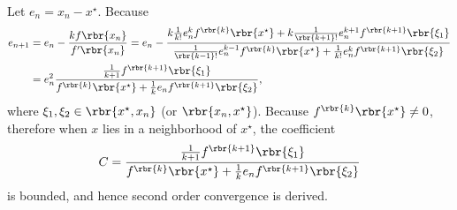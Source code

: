 \documentclass[english, nochinese]{../textmpls/pkupaper}
\title{\titlemark}
\author{\authoring}
\begin{document}
\maketitle

\begin{thmquestion}
\ 
\begin{thmproof}
Let $ e_n = x_n - x^{\star} $. Because
\begin{equation}
\begin{split}
e_{ n + 1 } &= e_n - \frac{ k f \rbr{x_n} }{ f' \rbr{x_n} } = e_n - \frac{ k \frac{1}{ k ! } e_n^k f^{\rbr{k}} \rbr{x^{\star}} + k \frac{1}{ \rbr{ k + 1 } ! } e_n^{ k + 1 } f^{\rbr{ k + 1 }} \rbr{\xi_1} }{ \frac{1}{ \rbr{ k - 1 } ! } e_n^{ k - 1 } f^{\rbr{k}} \rbr{x^{\star}} + \frac{1}{ k ! } e_n^k f^{\rbr{ k + 1 }} \rbr{\xi_2} } \\
&= e_n^2 \frac{ \frac{1}{ k + 1 } f^{\rbr{ k + 1 }} \rbr{\xi_1} }{ f^{\rbr{k}} \rbr{x^{\star}} + \frac{1}{k} e_n f^{\rbr{ k + 1 }} \rbr{\xi_2} },
\end{split}
\end{equation}
where $ \xi_1, \xi_2 \in \rbr{ x^{\star}, x_n } $ (or $ \rbr{ x_n, x^{\star} }$). Because $ f^{\rbr{k}} \rbr{x^{\star}} \neq 0 $, therefore when $x$ lies in a neighborhood of $x^{\star}$, the coefficient
\begin{equation}
C = \frac{ \frac{1}{ k + 1 } f^{\rbr{ k + 1 }} \rbr{\xi_1} }{ f^{\rbr{k}} \rbr{x^{\star}} + \frac{1}{k} e_n f^{\rbr{ k + 1 }} \rbr{\xi_2} }
\end{equation}
is bounded, and hence second order convergence is derived.

\sqed
\end{thmproof}
\end{thmquestion}
\end{document}
